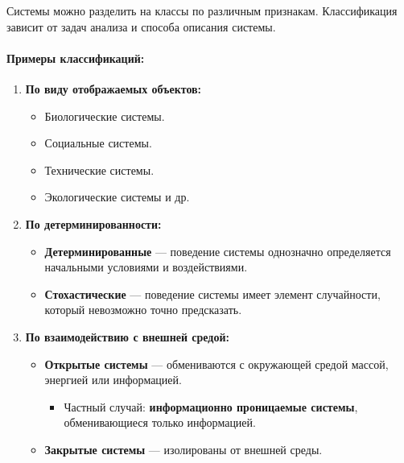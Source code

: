 \documentclass[
]{article}
\providecommand{\tightlist}{%
  \setlength{\itemsep}{0pt}\setlength{\parskip}{0pt}}
\begin{document}
Системы можно разделить на классы по различным признакам. Классификация
зависит от задач анализа и способа описания системы.

\paragraph{\texorpdfstring{\textbf{Примеры
классификаций:}}{Примеры классификаций:}}\label{ux43fux440ux438ux43cux435ux440ux44b-ux43aux43bux430ux441ux441ux438ux444ux438ux43aux430ux446ux438ux439}

\begin{enumerate}
\def\labelenumi{\arabic{enumi}.}
\item
  \textbf{По виду отображаемых объектов:}

  \begin{itemize}
  \tightlist
  \item
    Биологические системы.
  \item
    Социальные системы.
  \item
    Технические системы.
  \item
    Экологические системы и др.
  \end{itemize}
\item
  \textbf{По детерминированности:}

  \begin{itemize}
  \tightlist
  \item
    \textbf{Детерминированные} --- поведение системы однозначно
    определяется начальными условиями и воздействиями.
  \item
    \textbf{Стохастические} --- поведение системы имеет элемент
    случайности, который невозможно точно предсказать.
  \end{itemize}
\item
  \textbf{По взаимодействию с внешней средой:}

  \begin{itemize}
  \tightlist
  \item
    \textbf{Открытые системы} --- обмениваются с окружающей средой
    массой, энергией или информацией.

    \begin{itemize}
    \tightlist
    \item
      Частный случай: \textbf{информационно проницаемые системы},
      обменивающиеся только информацией.
    \end{itemize}
  \item
    \textbf{Закрытые системы} --- изолированы от внешней среды.
  \end{itemize}


\end{enumerate}
\end{document}
